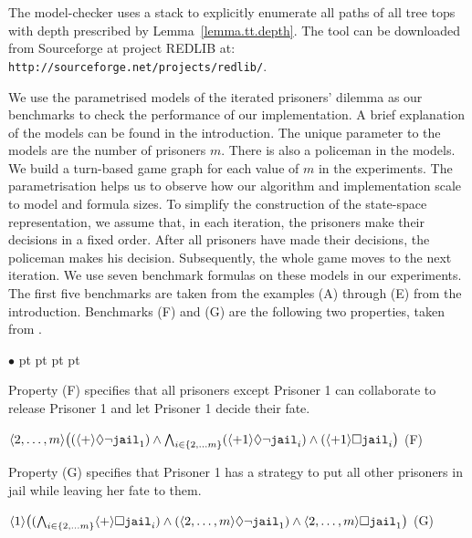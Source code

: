 \documentclass{llncs}
\newcommand{\pfrr}{\Box}
\newcommand{\pevt}{\Diamond}
\newenvironment{list1}{\begin{list}{$\bullet$}
{\topsep 0 pt \parsep 0 pt \partopsep 0 pt \itemsep 0 pt}}{\end{list}}
\begin{document}
The model-checker uses a stack to explicitly 
enumerate all paths of all tree tops 
with depth prescribed by Lemma~\ref{lemma.tt.depth}.  
The tool can be downloaded from Sourceforge at project REDLIB at: 
{\tt
http://sourceforge.net/projects/redlib/}.

We use the parametrised models of the iterated prisoners' dilemma 
as our benchmarks to check the performance of our implementation.  
A brief explanation of the models can be found in the introduction.  
The unique parameter to the models are the number of prisoners $m$.  
There is also a policeman in the models.  
We build a turn-based game graph for each value of $m$ in the experiments. 
The parametrisation helps us to observe how our algorithm and 
implementation scale to model and formula sizes.  
To simplify the construction of the state-space representation, 
we assume that, in each iteration, the prisoners make their decisions 
in a fixed order.
After all prisoners have made their decisions, 
the policeman makes his decision. Subsequently, the whole game moves to the 
next iteration.
%
We use seven benchmark formulas on these models in our experiments.  
The first five benchmarks are taken from the examples (A) through (E) from the introduction.
Benchmarks (F) and (G) are the following two properties, taken from \cite{WHY11}. 
\begin{list1} 
\item Property (F) specifies that all prisoners except Prisoner 1 can collaborate 
  to release Prisoner 1 and let Prisoner 1 decide their fate.

  $\langle 2,\ldots,m\rangle \big((\langle + \rangle \pevt \neg \mbox{\tt jail}_1) \wedge
  \bigwedge_{i \in \{2,\ldots m\}} (\langle +1 \rangle \pevt \neg \mbox{\tt jail}_i) \wedge
  (\langle +1 \rangle \pfrr \mbox{\tt jail}_i\big)$
  \hfill (F) 
\item Property (G) specifies that Prisoner 1 has a strategy to put all other prisoners in jail while leaving her fate to them.

    $\langle 1\rangle \big( (\bigwedge_{i \in \{2,\ldots m\}} \langle + \rangle \pfrr \mbox{\tt jail}_i) \wedge
    (\langle 2,\ldots,m\rangle \pevt \neg \mbox{\tt jail}_1) \wedge \langle 2,\ldots,m\rangle \pfrr \mbox{\tt jail}_1 \big)$
  \hfill 
  (G) 
\end{list1} 
\end{document}
